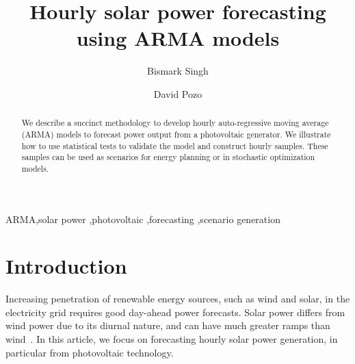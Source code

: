 \documentclass[review]{elsarticle}
\begin{document}
\begin{frontmatter}

\title{Hourly solar power forecasting using ARMA models}

\author{Bismark Singh}
\address{Discrete Mathematics \& Optimization, Sandia National Laboratories 
}


\author{David Pozo}
\address{Center for Energy Systems, Skolkovo Institute of Science and 
Technology}

\begin{abstract}
We describe a succinct methodology to develop hourly auto-regressive moving 
average (ARMA) models to forecast power output from a photovoltaic generator. 
We illustrate how to use 
statistical tests to validate the model and construct hourly samples. These 
samples can be used as scenarios for energy planning or in stochastic 
optimization models.
\end{abstract}

\begin{keyword}
ARMA\sep solar power \sep photovoltaic \sep forecasting \sep scenario 
generation
\end{keyword}

\end{frontmatter}

\linenumbers

\section{Introduction}
Increasing penetration of renewable energy sources, such as wind and solar, in 
the electricity grid requires good day-ahead power forecasts. Solar power 
differs from wind power due to its diurnal nature, and can have much greater 
ramps than wind~\cite{graabak2016variability}. In this article, we focus 
on forecasting  hourly solar power generation, in particular from photovoltaic technology. 
\end{document}
